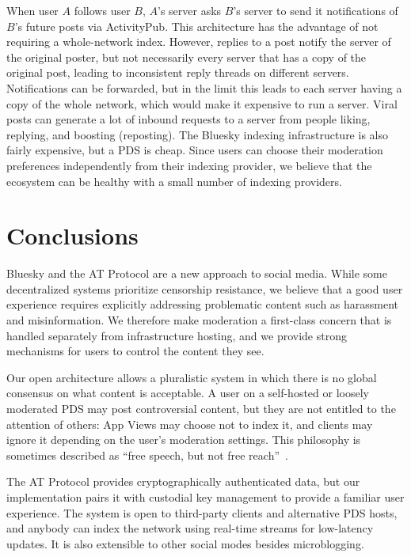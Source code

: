 \documentclass[sigconf,nonacm]{acmart}
\begin{document}
When user $A$ follows user $B$, $A$'s server asks $B$'s server to send it notifications of $B$'s future posts via ActivityPub.
This architecture has the advantage of not requiring a whole-network index.
However, replies to a post notify the server of the original poster, but not necessarily every server that has a copy of the original post, leading to inconsistent reply threads on different servers.
Notifications can be forwarded, but in the limit this leads to each server having a copy of the whole network, which would make it expensive to run a server.
Viral posts can generate a lot of inbound requests to a server from people liking, replying, and boosting (reposting).
The Bluesky indexing infrastructure is also fairly expensive, but a PDS is cheap.
Since users can choose their moderation preferences independently from their indexing provider, we believe that the ecosystem can be healthy with a small number of indexing providers.



\section{Conclusions}

Bluesky and the AT Protocol are a new approach to social media.
While some decentralized systems prioritize censorship resistance, we believe that a good user experience requires explicitly addressing problematic content such as harassment and misinformation.
We therefore make moderation a first-class concern that is handled separately from infrastructure hosting, and we provide strong mechanisms for users to control the content they see.

Our open architecture allows a pluralistic system in which there is no global consensus on what content is acceptable.
A user on a self-hosted or loosely moderated PDS may post controversial content, but they are not entitled to the attention of others: App Views may choose not to index it, and clients may ignore it depending on the user's moderation settings.
This philosophy is sometimes described as ``free speech, but not free reach''~\cite{DiResta:2018}.

The AT Protocol provides cryptographically authenticated data, but our implementation pairs it with custodial key management to provide a familiar user experience.
The system is open to third-party clients and alternative PDS hosts, and anybody can index the network using real-time streams for low-latency updates.
It is also extensible to other social modes besides microblogging.
\end{document}
